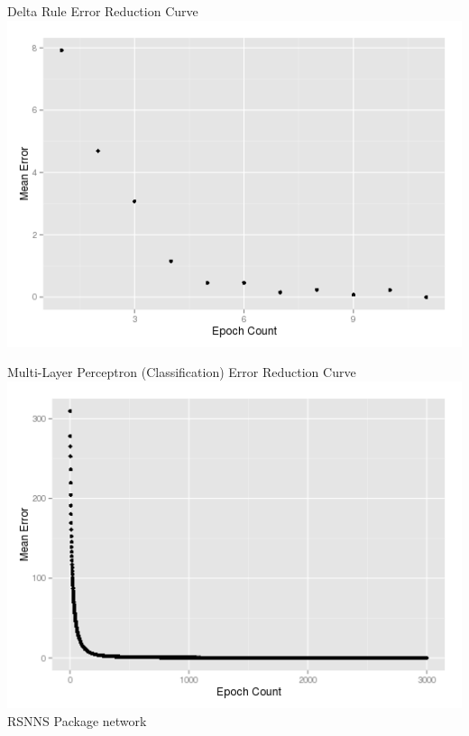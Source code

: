 \documentclass[xcolor=table]{beamer}
\begin{document}
\begin{frame}
 
 Delta Rule Error Reduction Curve\\
 \includegraphics[scale=0.4]{deltaError.png}
 
\end{frame}
\begin{frame}
 Multi-Layer Perceptron (Classification) Error Reduction Curve\\
 \includegraphics[scale=0.4]{mlpClassification.png}
 RSNNS Package network
\end{frame}
\end{document}

